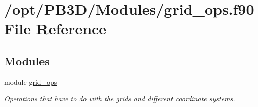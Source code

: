 \hypertarget{grid__ops_8f90}{}\section{/opt/\+P\+B3\+D/\+Modules/grid\+\_\+ops.f90 File Reference}
\label{grid__ops_8f90}
\subsection*{Modules}
\begin{DoxyCompactItemize}
\item 
module \hyperlink{namespacegrid__ops}{grid\+\_\+ops}
\begin{DoxyCompactList}\small\item\em Operations that have to do with the grids and different coordinate systems. \end{DoxyCompactList}\end{DoxyCompactItemize}
